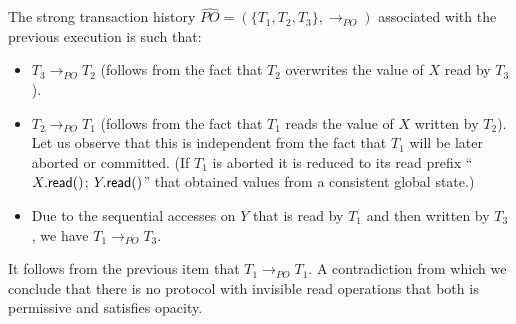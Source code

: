 \begin{proofT}
\begin{enumerate}
\end{enumerate}

\begin{figure}[htb!]
\end{figure}




\noindent
The strong transaction history $\widehat{PO}=(\{T_1,T_2,T_3\}, 
\rightarrow_{PO})$  associated with the previous execution is such that: 
%
\begin{itemize}
\vspace{-0.15cm}
\item   $T_3 \rightarrow_{PO}  T_2$ (follows from the fact that $T_2$ 
overwrites the value of $X$ read by $T_3$). 
\vspace{-0.25cm}
\item   $T_2 \rightarrow_{PO}   T_1$ (follows from the fact that $T_1$ 
reads the  value of  $X$ written  by  $T_2$). Let  us observe that this is
independent from the fact that  $T_1$ will be later  aborted or committed. 
(If $T_1$ is aborted it is reduced to its read prefix 
``$X.{\sf  read}()$;  $Y.{\sf  read}()$''  that  obtained values from a
consistent global state.)   
\vspace{-0.25cm}
\item Due to the sequential accesses on $Y$ that is read by $T_1$ and 
then written by $T_3$, we have  $T_1 \rightarrow_{PO} T_3$. 
\end{itemize}
\vspace{-0.15cm}
It follows from the previous item that $T_1 \rightarrow_{PO}   T_1$. 
A contradiction  from which we conclude that there is no protocol 
with invisible read operations that both is permissive and satisfies opacity. 



\end{proofT}
